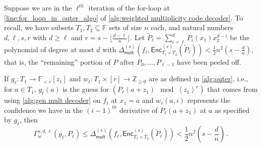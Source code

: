 \documentclass{article}
\def\Integer{\mathbb{Z}}
\def\Field{\mathbb{F}}
\let\Z\Integer
\let\F\Field
\renewcommand{\tilde}[1]{\widetilde{#1}}
\newcommand{\ip}[1]{\left\langle #1 \right\rangle}
\newcommand{\enc}{{\mathsf{Enc}}}
\newcommand{\Delm}{\Delta_{\mathsf{mult}}}
\begin{document}
	\begin{lemma}\label{lem: gamma comparison to usual distance}
		Suppose we are in the $\ell^{th}$ iteration of the for-loop at \cref{line:for_loop_in_outer_algo} of \cref{alg:weighted multiplicity code decoder}.
		To recall, we have subsets $T_1, T_2 \subseteq \F$  sets of size $n$ each, and natural numbers $d, \ell, s, r$  with $d \geq \ell$ and $r = s - \lfloor \frac{d-\ell}{n} \rfloor$. 
		Let $\tilde{P}_\ell = \sum_{i = \ell}^d P_i(x_1)x_2^{d-i}$ be the polynomial of degree at most $d$ with $\Delm^{(s)}(f_\ell,\enc^{(s)}_{T_1\times T_2}(\tilde{P}_\ell)) < \frac{1}{2} n^2 (s-\frac{d}{n})$, that is, the ``remaining'' portion of $P$ after $P_0, \dotsc, P_{\ell-1}$ have been peeled off.
		
		If $g_{\ell}\colon  T_1 \to \F_{<r}[z_1]$ and $w_{\ell}\colon  T_1 \times [r] \to \Z_{\geq 0}$ are  as defined in \cref{alg:outer}, i.e., for $a\in T_1$, $g_\ell(a)$ is the guess for $(P_{\ell}(a+z_1) \mod \ip{z_1}^r)$ that comes from using \cref{alg:gen mult decoder} on $f_\ell$ at $x_1=a$ and $w_\ell(a,i)$ represents the confidence we have in the $(i-1)^{th}$ derivative of $P_\ell(a+z_1)$ at $a$ as specified by $g_\ell$,  then 
		\[
		\Gamma_{w}^{s, d, \ell}(g_{\ell}, P_{\ell}) \leq \Delm^{(s)}(f_\ell, \enc^{(s)}_{T_1\times T_2}(\tilde{P}_\ell)) < \frac{1}{2}n^2\left(s - \frac{d}{n}\right) \, .
		\]
	\end{lemma}
	
\end{document}
